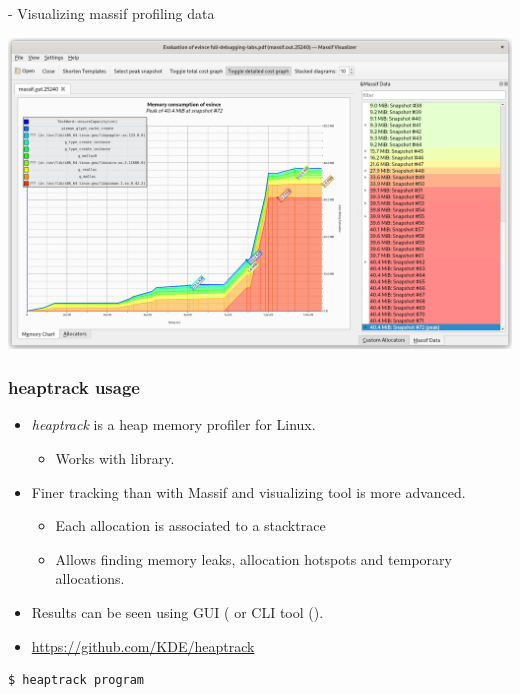 \begin{frame}{ - Visualizing massif profiling data}
  \begin{center}
    \includegraphics[height=0.8\textheight]{slides/debugging-application-profiling/massif_visualizer.png}
  \end{center}
\end{frame}

\begin{frame}[fragile]
  \frametitle{heaptrack usage}
  \begin{itemize}
    \item {\em heaptrack} is a heap memory profiler for Linux.
    \begin{itemize}
      \item Works with  library.
    \end{itemize}
    \item Finer tracking than with Massif and visualizing tool is more advanced.
    \begin{itemize}
      \item Each allocation is associated to a stacktrace
      \item Allows finding memory leaks, allocation hotspots and
            temporary allocations.
    \end{itemize}
    \item Results can be seen using GUI ( or CLI tool
          ().
    \item \url{https://github.com/KDE/heaptrack}
  \end{itemize}
  \begin{block}{}
    \begin{verbatim}
$ heaptrack program
    \end{verbatim}
  \end{block}
\end{frame}

